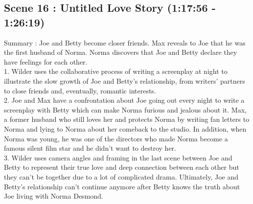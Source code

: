 \documentclass[a4paper]{article}
\begin{document}
\subsection{Scene 16 : Untitled Love Story (1:17:56 - 1:26:19)}
Summary : Joe and Betty become closer friends. Max reveals to Joe that he was the first
husband of Norma. Norma discovers that Joe and Betty declare they have feelings for each
other.\\
1. Wilder uses the collaborative process of writing a screenplay at night to illustrate the
slow growth of Joe and Betty's relationship, from writers' partners to close friends
and, eventually, romantic interests.\\
2. Joe and Max have a confrontation about Joe going out every night to write a
screenplay with Betty which can make Norma furious and jealous about it. Max, a
former husband who still loves her and protects Norma by writing fan letters to
Norma and lying to Norma about her comeback to the studio. In addition, when
Norma was young, he was one of the directors who made Norma become a famous
silent film star and he didn't want to destroy her.\\
3. Wilder uses camera angles and framing in the last scene between Joe and Betty to
represent their true love and deep connection between each other but they can’t be
together due to a lot of complicated drama. Ultimately, Joe and Betty's relationship
can’t continue anymore after Betty knows the truth about Joe living with Norma
Desmond.\\
\end{document}
